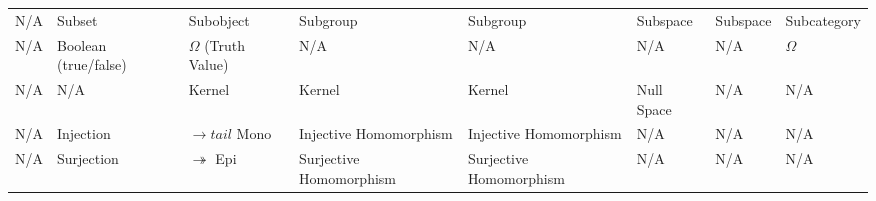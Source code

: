 \begin{landscape}
\begin{table}[h!]
{\begin{tabular}{l|l|l|l|l|l|l|l}
N/A                       & Subset               & Subobject                    & Subgroup                & Subgroup                & Subspace                  & Subspace            & Subcategory                     \\
N/A                       & Boolean (true/false) & $\Omega$ (Truth Value)       & N/A                     & N/A                     & N/A                       & N/A                 & $\Omega$                        \\
N/A                       & N/A                  & Kernel                       & Kernel                  & Kernel                  & Null Space                & N/A                 & N/A                             \\
N/A                       & Injection            & $\rightarrow tail$ Mono      & Injective Homomorphism  & Injective Homomorphism  & N/A                       & N/A                 & N/A                             \\
N/A                       & Surjection           & $\twoheadrightarrow$ Epi     & Surjective Homomorphism & Surjective Homomorphism & N/A                       & N/A                 & N/A                             
\end{tabular}
}

\end{table}
\end{landscape}
